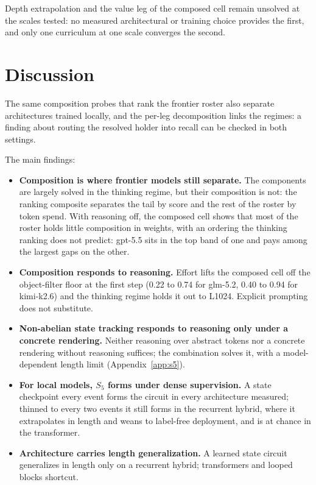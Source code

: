 \documentclass[11pt]{article}
\newcommand{\Sfive}{$S_5$}
\begin{document}
Depth extrapolation and the value leg of the composed cell remain unsolved at the scales
tested: no measured architectural or training choice provides the first, and only one
curriculum at one scale converges the second.

\section{Discussion}

The same composition probes that rank the frontier roster also separate architectures trained
locally, and the per-leg decomposition links the regimes: a finding about routing the resolved holder into recall can be checked in both
settings.

The main findings:

\begin{itemize}
\item \textbf{Composition is where frontier models still separate.} The components are largely
  solved in the thinking regime, but their composition is not: the ranking composite separates
  the tail by score and the rest of the roster by token spend. With
  reasoning off, the composed cell shows that most of the roster holds little composition in weights, with an ordering the thinking ranking does not predict: gpt-5.5 sits in the top band of one and pays among the largest gaps on the other.
\item \textbf{Composition responds to reasoning.} Effort lifts the composed
  cell off the object-filter floor at the first step (0.22 to 0.74 for glm-5.2, 0.40 to 0.94
  for kimi-k2.6) and the thinking regime holds it out to L1024. Explicit prompting does not
  substitute.
\item \textbf{Non-abelian state tracking responds to reasoning only under a concrete
  rendering.} Neither reasoning over abstract tokens nor a concrete rendering without
  reasoning suffices; the combination solves it, with a model-dependent length limit
  (Appendix~\ref{app:s5}).
\item \textbf{For local models, \Sfive{} forms under dense supervision.} A state checkpoint
  every event forms the circuit in every architecture measured; thinned to every two events
  it still forms in the recurrent hybrid, where it extrapolates in length and weans to
  label-free deployment, and is at chance in the transformer.
\item \textbf{Architecture carries length generalization.} A learned state circuit generalizes
  in length only on a recurrent hybrid; transformers and looped blocks shortcut.
\end{itemize}
\end{document}
